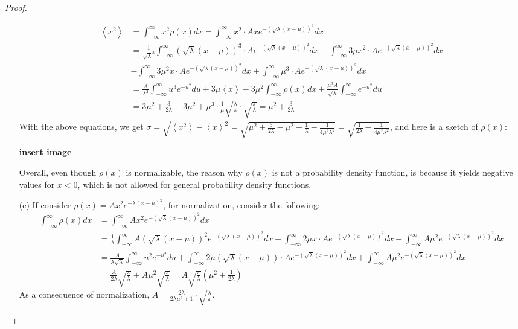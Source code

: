 \documentclass{article}
\begin{document}
\begin{proof}
\begin{itemize}
        \begin{align}
            \left<x^2\right>&=\int_{-\infty}^{\infty}x^2\rho(x)dx = \int_{-\infty}^{\infty}x^2 \cdot Axe^{-(\sqrt{\lambda}(x-\mu))^2}dx\\
            &= \frac{1}{\sqrt{\lambda}^3}\int_{-\infty}^{\infty}(\sqrt{\lambda}(x-\mu))^3\cdot Ae^{-(\sqrt{\lambda}(x-\mu))^2}dx+\int_{-\infty}^{\infty}3\mu x^2\cdot Ae^{-(\sqrt{\lambda}(x-\mu))^2}dx\\ &- \int_{-\infty}^{\infty}3\mu^2 x\cdot Ae^{-(\sqrt{\lambda}(x-\mu))^2}dx +\int_{-\infty}^{\infty}\mu^3\cdot Ae^{-(\sqrt{\lambda}(x-\mu))^2}dx\\
            &=\frac{A}{\lambda^2}\int_{-\infty}^{\infty}u^3e^{-u^2}du + 3\mu\left<x\right> - 3\mu^2\int_{-\infty}^{\infty}\rho(x)dx + \frac{\mu^3A}{\sqrt{\lambda}}\int_{-\infty}^{\infty}e^{-u^2}du\\
            &= 3\mu^2+\frac{3}{2\lambda} - 3\mu^2 + \mu^3\cdot \frac{1}{\mu}\sqrt{\frac{\lambda}{\pi}}\cdot\sqrt{\frac{\pi}{\lambda}}=\mu^2+\frac{3}{2\lambda}
        \end{align}
        With the above equations, we get $\sigma=\sqrt{\left<x^2\right>-\left<x\right>^2} = \sqrt{\mu^2+\frac{3}{2\lambda}-\mu^2-\frac{1}{\lambda}-\frac{1}{4\mu^2\lambda^2}} = \sqrt{\frac{1}{2\lambda}-\frac{1}{4\mu^2\lambda^2}}$, and here is a sketch of $\rho(x)$:

        \textbf{insert image}

        Overall, even though $\rho(x)$ is normalizable, the reason why $\rho(x)$ is not a probability density function, is because it yields negative values for $x<0$, which is not allowed for general probability density functions.

        \item[(c)] If consider $\rho(x)=Ax^2e^{-\lambda(x-\mu)^2}$, for normalization, consider the following:
        \begin{align}
            \int_{-\infty}^{\infty}\rho(x)dx &= \int_{-\infty}^{\infty}Ax^2e^{-(\sqrt{\lambda}(x-\mu))^2}dx\\&= \frac{1}{\lambda}\int_{-\infty}^{\infty}A(\sqrt{\lambda}(x-\mu))^2e^{-(\sqrt{\lambda}(x-\mu))^2}dx + \int_{-\infty}^{\infty}2\mu x\cdot Ae^{-(\sqrt{\lambda}(x-\mu))^2}dx-\int_{-\infty}^{\infty}A\mu^2e^{-(\sqrt{\lambda}(x-\mu))^2}dx\\
            &= \frac{A}{\lambda\sqrt{\lambda}}\int_{-\infty}^{\infty}u^2e^{-u^2}du + \int_{-\infty}^{\infty}2\mu(\sqrt{\lambda}(x-\mu))\cdot Ae^{-(\sqrt{\lambda}(x-\mu))^2}dx+\int_{-\infty}^{\infty}A\mu^2e^{-(\sqrt{\lambda}(x-\mu))^2}dx\\
            &= \frac{A}{2\lambda}\sqrt{\frac{\pi}{\lambda}}+A\mu^2\sqrt{\frac{\pi}{\lambda}} = A\sqrt{\frac{\pi}{\lambda}}\left(\mu^2+\frac{1}{2\lambda}\right)
        \end{align}
        As a consequence of normalization, $A=\frac{2\lambda}{2\lambda\mu^2+1}\cdot\sqrt{\frac{\lambda}{\pi}}$.


\end{itemize}
\end{proof}
\end{document}
